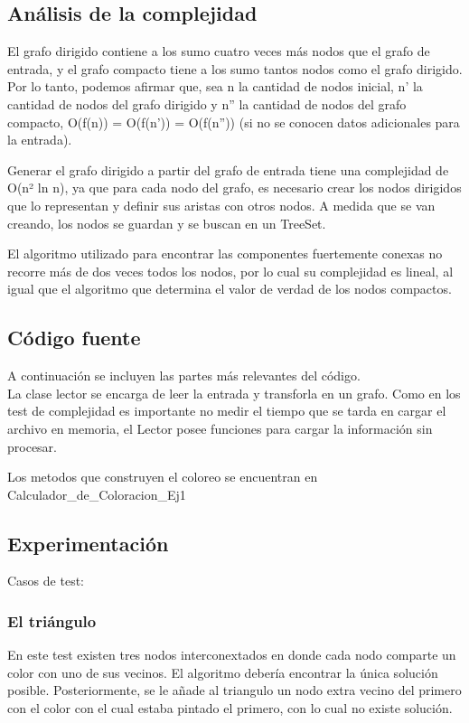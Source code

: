 \subsection{Análisis de la complejidad}
El grafo dirigido contiene a los sumo cuatro veces más nodos que el grafo de entrada, y el grafo compacto tiene a los sumo tantos nodos como el grafo dirigido. Por lo tanto, podemos afirmar que, sea n la cantidad de nodos inicial, n' la cantidad de nodos del grafo dirigido y n'' la cantidad de nodos del grafo compacto, O(f(n)) =  O(f(n')) = O(f(n'')) (si no se conocen datos adicionales para la entrada).

Generar el grafo dirigido a partir del grafo de entrada tiene una complejidad de O(n² ln n), ya que para cada nodo del grafo, es necesario crear los nodos dirigidos que lo representan y definir sus aristas con otros nodos. A medida que se van creando, los nodos se guardan y se buscan en un TreeSet.

El algoritmo utilizado para encontrar las componentes fuertemente conexas no recorre más de dos veces todos los nodos, por lo cual su complejidad es lineal, al igual que el algoritmo que determina el valor de verdad de los nodos compactos.

\subsection{Código fuente}

A continuación se incluyen las partes más relevantes del código.\\
La clase lector se encarga de leer la entrada y transforla en un grafo. Como en los test de complejidad es importante no medir el tiempo que se tarda en cargar el archivo en memoria, el Lector posee funciones para cargar la información sin procesar.

Los metodos que construyen el coloreo se encuentran en Calculador_de_Coloracion_Ej1 \\


\subsection{Experimentación}
Casos de test:
\subsubsection{El triángulo}
En este test existen tres nodos interconextados en donde cada nodo comparte un color con uno de sus vecinos. El algoritmo debería encontrar la única solución posible.
Posteriormente, se le añade al triangulo un nodo extra vecino del primero con el color con el cual estaba pintado el primero, con lo cual no existe solución.
